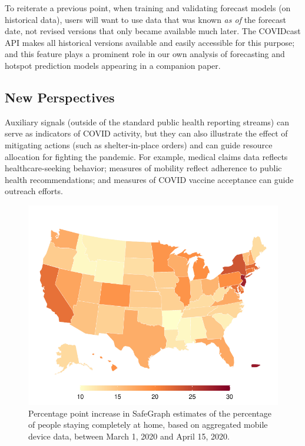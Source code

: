 \documentclass[9pt,twocolumn,twoside,lineno]{pnas-new}
\begin{document}
To reiterate a previous point, when training and validating forecast models (on
historical data), users will want to use data that was known \textit{as of} the
forecast date, not revised versions that only became available much later. The
COVIDcast API makes all historical versions available and easily accessible for
this purpose; and this feature plays a prominent role in our own analysis of
forecasting and hotspot prediction models appearing in a companion paper.

\subsection{New Perspectives}

Auxiliary signals (outside of the standard public health reporting streams) can
serve as indicators of COVID activity, but they can also illustrate the effect
of mitigating actions (such as shelter-in-place orders) and can guide resource
allocation for fighting the pandemic. For example, medical claims data reflects
healthcare-seeking behavior; measures of mobility reflect adherence to public
health recommendations; and measures of COVID vaccine acceptance can guide
outreach efforts.

\begin{figure}
  \centering
  \includegraphics[width=\columnwidth]{fig/mobility-drop.pdf}
  \caption{Percentage point increase in SafeGraph estimates of the percentage of
  people staying completely at home, based on aggregated mobile device data,
  between March 1, 2020 and April 15, 2020.}
  \label{fig:mobility-drop}
\end{figure}
\end{document}
